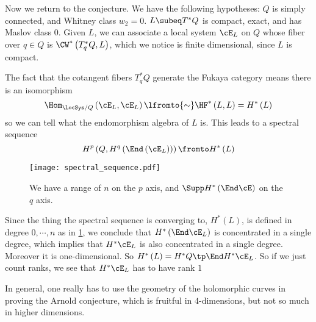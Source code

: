 \documentclass{amsart}
\begin{document}
Now we return to the conjecture.
We have the following hypotheses:
$Q$ is simply connected, and Whitney class $w_2 = 0$.
$L\subeq T^* Q$ is compact, exact, and has Maslov class $0$. 
Given $L$, we can associate a local system $\cE_L$ on $Q$
whose fiber over $q\in Q$ is 
$\CW^*\left( T_q^* Q , L \right)$, which we notice is finite dimensional,
since $L$ is compact.

The fact that the cotangent fibers $T^*_q Q$
generate the Fukaya category means there is an isomorphism
\begin{equation}
\Hom_{\LocSys/Q}\left( \cE_L , \cE_L \right)\lfromto{\sim} 
\HF^*\left( L , L \right) = H^*\left( L  \right)
\end{equation}
so we can tell what the endomorphism algebra of $L$ is.
This leads to a spectral sequence 
\begin{equation}
H^p\left( Q , H^q\left( \End\left( \cE_L \right) \right) \right)\fromto
H^*\left( L \right)
\end{equation}
\begin{figure}
\texttt{[image: spectral\_sequence.pdf]}
\caption{We have a range of $n$ on the $p$ axis, 
and $\Supp H^*\left( \End \cE \right)$ on the $q$ axis.}
\label{fig:spectral}
\end{figure}
Since the thing the spectral sequence is converging to,
$H^*\left( L \right)$, is defined in degree $0, \cdots , n$
as in \cref{fig:spectral},
we conclude that $H^*\left(\End \cE_L \right)$ is concentrated in a single degree,
which implies that $H^*\cE_L$ is also concentrated in a single degree.
Moreover it is one-dimensional.
So $H^*\left( L \right) = H^*Q \tp \End H^* \cE_L$. 
So if we just count ranks, we see that 
$H^* \cE_L$ has to have rank $1$

In general, one really has to use the geometry of the holomorphic curves in 
proving the Arnold conjecture,
which is fruitful in $4$-dimensions, but not so much in higher dimensions.
\end{document}
